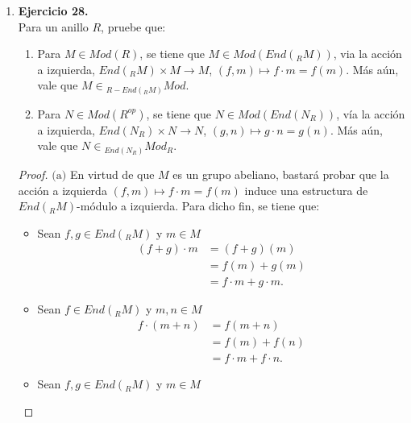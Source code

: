 \documentclass{article}
\newcommand{\lrprth}[1]{
	\left(#1\right)
}
\newcommand{\opst}[1]{
	{#1}^{op}
}
\newcommand{\ringbimod}[4]{
	\if#4l
	{}_{#1-#2}#3
	\else
	\if#4r
	#3_{#1-#2}
	\else 
	\ifstrequal{#4}{lr}{
		{}_{#1}#3_{#2}
	}
	\fi
	\fi
}
\newcommand{\ringmodhom}[3]{
	Hom_{#1}\lrprth{#2,#3}
}
\theoremstyle{definition}
\theoremstyle{plain}
\theoremstyle{plain}
\theoremstyle{definition}
\theoremstyle{definition}
\theoremstyle{definition}
\theoremstyle{definition}
\theoremstyle{definition}
\theoremstyle{definition}
\begin{document}
\begin{enumerate}[label=\textbf{Ej \arabic*.}]
\begin{proof}
\begin{align*}
	\end{align*}
i.e. $\rho$ es un morfismo de $R$-izquierda $S'$-derecha bimódulos, de $eM$ en $\ringmodhom{R}{\ringbimod{R}{R'}{Re}{lr}}{\ringbimod{R}{S}{M}{lr}}$. En forma análoga, empleando ahora las acciones previamente definidas en conjunto a las acciones definidas en el Ej. 24(b), se verifica que $\lambda$ un morfismo de $R'$-izquierda $S$-derecha bimódulos, de $M\epsilon$ en $\ringmodhom{S}{\ringbimod{S'}{S }{Re}{lr}}{\ringbimod{R}{S}{M}{lr}}$.\\
\end{proof}
\item\textbf{Ejercicio 28.}\\
Para un anillo $R$, pruebe que:
\begin{enumerate}
	\item Para $M \in Mod\lrprth{R}$, se tiene que $M \in Mod\lrprth{End\lrprth{_{R}M}}$, via la acción a izquierda, $End\lrprth{_{R}M} \times M \longrightarrow M$, $\lrprth{f,m} \mapsto f \cdot m = f\lrprth{m}$. Más aún, vale que $M \in {}_{R-End\lrprth{_{R}M}}Mod$.
	\item Para $N \in Mod\lrprth{\opst{R}}$, se tiene que $N \in Mod\lrprth{End\lrprth{N_{R}}}$, vía la acción a izquierda, $End\lrprth{N_{R}} \times N \longrightarrow N$, $\lrprth{g,n} \mapsto g \cdot n = g\lrprth{n}$. Más aún, vale que $N \in {}_{End\lrprth{N_{R}}}Mod_{R}$.
\end{enumerate}
\begin{proof}
	$\boxed{\text{(a)}}$ En virtud de que $M$ es un grupo abeliano, bastará probar que la acción a izquierda $\lrprth{f,m} \mapsto f \cdot m = f\lrprth{m}$ induce una estructura de $End\lrprth{_{R}M}$-módulo a izquierda. Para dicho fin, se tiene que:
	\begin{itemize}
		\item Sean $f,g \in End\lrprth{_{R}M}$ y $m \in M$
		\begin{align*}
			\lrprth{f+g} \cdot m&=\lrprth{f+g}\lrprth{m}\\
			&=f\lrprth{m}+g\lrprth{m}\\
			&=f \cdot m+g \cdot m.
		\end{align*}
		\item Sean $f \in End\lrprth{_{R}M}$ y $m,n \in M$
		\begin{align*}
			f \cdot \lrprth{m+n}&=f\lrprth{m+n}\\
			&=f\lrprth{m}+f\lrprth{n}\\
			&=f \cdot m+f \cdot n.
		\end{align*}
		\item Sean $f,g \in End\lrprth{_{R}M}$ y $m \in M$

\end{itemize}
\end{proof}
\end{enumerate}
\end{document}
